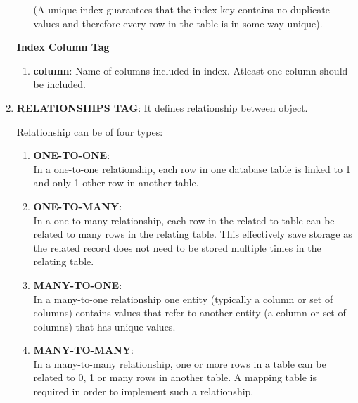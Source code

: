 \begin{enumerate}
\begin{enumerate}
				\par
				(A unique index guarantees that the index key contains no duplicate values and therefore every row in the table is in some way unique). 

		\end{enumerate}


		\par
		\textbf{Index Column Tag}

		\begin{enumerate}

			\item \small \textbf{column}: Name of columns included in index. Atleast one column should be included.

		\end{enumerate}
		

	
	\item \small \textbf{RELATIONSHIPS TAG}: It defines relationship between object.

		\par
		Relationship can be of four types:

		\begin{enumerate}

			\item \small \textbf{ONE-TO-ONE}: \textit{\[<one-to-one>\]} In a one-to-one relationship, each row in one database table is linked to 1 and only 1 other row in another table.

			\item \small \textbf{ONE-TO-MANY}: \textit{\[<one-to-many>\]} In a one-to-many relationship, each row in the related to table can be related to many rows in the relating table. This effectively save storage as the related record does not need to be stored multiple times in the relating table.

			\item \small \textbf{MANY-TO-ONE}: \textit{\[<many-to-one>\]} In a many-to-one relationship one entity (typically a column or set of columns) contains values that refer to another entity (a column or set of columns) that has unique values.
	
			\item \small \textbf{MANY-TO-MANY}: \textit{\[<many-to-many>\]} In a many-to-many relationship, one or more rows in a table can be related to 0, 1 or many rows in another table. A mapping table is required in order to implement such a relationship.
	
		\end{enumerate}


\end{enumerate}

